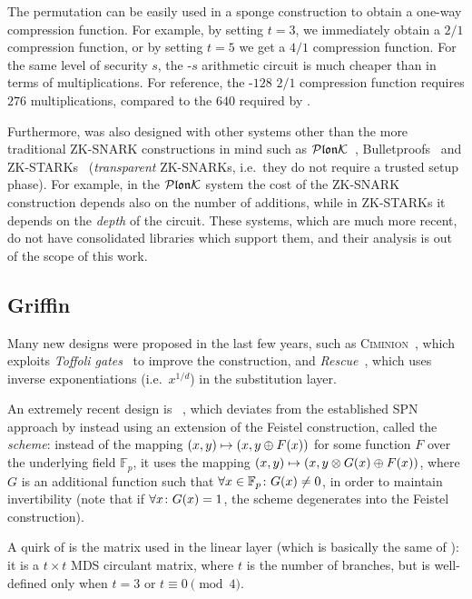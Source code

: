 The \Poseidon{} permutation can be easily used in a sponge construction to obtain a
one-way compression function.
For example, by setting \(t = 3\), we immediately obtain a \(2/1\) compression function, 
or by setting \(t = 5\) we get a \(4/1\) compression function.
For the same level of security \(s\), the \Poseidon-\(s\) arithmetic circuit is much cheaper than 
\Mimc{} in terms of multiplications. 
For reference, the \Poseidon-\(128\) \(2/1\) compression function requires \(276\) 
multiplications, compared to the \(640\) required by \Mimc{}.

Furthermore, \Poseidon{} was also designed with other systems other than the more traditional 
ZK-SNARK constructions in mind such as \(\mathcal{P}\mathfrak{lon}\mathcal{K} \)~\cite{GabizonWC2019}, 
Bulletproofs~\cite{BunzBBPWM2017} and ZK-STARKs~\cite{SassonBHR2018} 
(\emph{transparent} ZK-SNARKs, i.e.\ they do not require a trusted setup phase).
For example, in the \(\mathcal{P}\mathfrak{lon}\mathcal{K} \) system the cost of the ZK-SNARK construction depends also 
on the number of additions, while in ZK-STARKs it depends on the \emph{depth} of the circuit.
These systems, which are much more recent, do not have consolidated libraries which support them, 
and their analysis is out of the scope of this work.

\subsection{Griffin}
Many new designs were proposed in the last few years, such as 
\textsc{Ciminion}~\cite{DobraunigGGK2021}, which exploits \emph{Toffoli gates}~\cite{Toffoli1980} 
to improve the construction, and \textit{Rescue}~\cite{AlyABDS2019}, which uses inverse 
exponentiations (i.e.\  \(x^{1/d}\)) in the substitution layer.

An extremely recent design is \Griffin~\cite{GrassiHRSWW2022}, which deviates from the
established SPN approach by instead using an extension of the Feistel construction, called the 
\emph{\Horst{} scheme}: instead of the mapping 
\(\Tuple{x, y} \mapsto \Tuple{x, y \oplus \call{F}{x}}\) for some function \(F\) over the 
underlying field \(\mathbb{F}_p\), it uses the mapping 
\(\Tuple{x, y} \mapsto \Tuple{x, y \otimes \call{G}{x} \oplus \call{F}{x}}\), where \(G\) is an 
additional function such that \(\forall x \in \mathbb{F}_p\colon \call{G}{x} \neq 0\), in order 
to maintain invertibility (note that if \(\forall x\colon \call{G}{x} = 1\), the \Horst{} scheme
degenerates into the Feistel construction).

A quirk of \Griffin{} is the matrix used in the linear layer (which is basically the same of 
\Poseidon): it is a \(t \times t\) MDS circulant matrix, where \(t\) is the number of branches, 
but is well-defined only when \(t = 3\) or \(t \equiv 0 \pmod{4}\).

